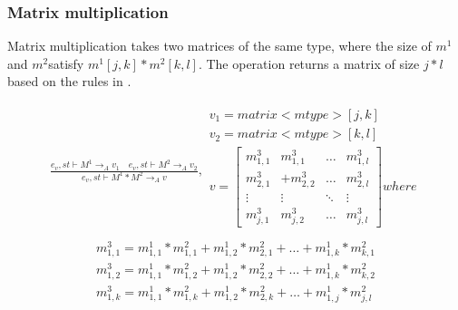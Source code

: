 \subsubsection{Matrix multiplication}
Matrix multiplication takes two matrices of the same type, where the size of $m^{1}$ and $m^{2}$satisfy $m^{1}[j,k]*m^{2}[k,l]$.
The operation returns a matrix of size $j*l$ based on the rules in .

\begin{minipage}{1.0\textwidth}
\begin{equation}\label{hypeproduct}
\begin{aligned}
	\frac { { e }_{ v },st\vdash { M }^{ 1 }{ \rightarrow  }_{ A }{ v }_{ 1 }\quad { e }_{ v },st\vdash { M }^{ 2 }{ \rightarrow  }_{ A }{ v }_{ 2 } }{ { e }_{ v },st\vdash { M }^{ 1 }*{ M }^{ 2 }{ \rightarrow  }_{ A }{ v } } ,\begin{matrix} { v }_{ 1 }=matrix<mtype>[j,k] \\ { v }_{ 2 }=matrix<mtype>[k,l] \\ v=\begin{bmatrix} { { m }_{ 1,1 }^{ 3 } } & { { m }_{ 1,1 }^{ 3 } } & \dots  & { m }_{ 1,l }^{ 3 } \\ { { m }_{ 2,1 }^{ 3 } } & +{ { m }_{ 2,2 }^{ 3 } } & \dots  & { { m }_{ 2,l }^{ 3 } } \\ \vdots  & \vdots  & \ddots  & \vdots  \\ { m }_{ j,1 }^{ 3 } & { { m }_{ j,2 }^{ 3 } } & \dots  & { m }_{ j,l }^{ 3 } \end{bmatrix}where \\  \end{matrix}
\end{aligned}
\end{equation}
\begin{equation*}
\begin{aligned}
{ { m }_{ 1,1 }^{ 3 } }  = { { m }_{ 1,1 }^{ 1 } } *{ { m }_{ 1,1 }^{ 2 } }+ { { m }_{ 1,2 }^{ 1 } } *{ { m }_{ 2,1 }^{ 2 } }+\dots+ { { m }_{ 1,k }^{ 1 } } *{ { m }_{ k,1 }^{ 2 } }\\
{ { m }_{ 1,2 }^{ 3 } }  = { { m }_{ 1,1 }^{ 1 } } *{ { m }_{ 1,2 }^{ 2 } }+ { { m }_{ 1,2 }^{ 1 } } *{ { m }_{ 2,2 }^{ 2 } }+\dots+ { { m }_{ 1,k }^{ 1 } } *{ { m }_{ k,2 }^{ 2 } }\\
{ { m }_{ 1,k }^{ 3 } }  = { { m }_{ 1,1 }^{ 1 } } *{ { m }_{ 1,k }^{ 2 } }+ { { m }_{ 1,2 }^{ 1 } } *{ { m }_{ 2,k }^{ 2 } }+\dots+ { { m }_{ 1,j }^{ 1 } } *{ { m }_{ j,l }^{ 2 } }\\

\end{aligned}
\end{equation*}
\end{minipage}
